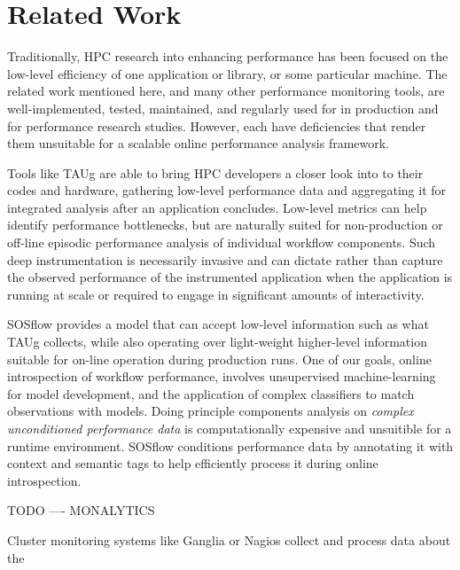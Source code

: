 
\section{Related Work}
%
Traditionally, HPC research into enhancing performance has been
focused on the low-level efficiency of one application or library, or
some particular machine.
%
The related work mentioned here, and many other performance monitoring
tools, are well-implemented, tested, maintained, and regularly used
for in production and for performance research studies.
%
However, each have deficiencies that render them unsuitable for a scalable
online performance analysis framework.
%
\par
%
Tools like TAUg \cite{huck2006taug} are able to bring HPC developers a closer look into to
their codes and hardware, gathering low-level performance data and
aggregating it for integrated analysis after an application concludes.
%
Low-level metrics can help identify performance bottlenecks, but are
naturally suited for non-production or off-line episodic performance
analysis of individual workflow components.
%
Such deep instrumentation is necessarily invasive and can dictate
rather than capture the observed performance of the instrumented
application when the application is running at scale or required to
engage in significant amounts of interactivity.
%
\par
%
SOSflow provides a model that can accept low-level information such as
what TAUg collects, while also operating over light-weight higher-level
information suitable for on-line operation during production runs.
%
One of our goals, online introspection of workflow performance,
involves unsupervised machine-learning for model development, and the
application of complex classifiers to match observations with models.
%
Doing principle components analysis on \textit{complex unconditioned
  performance data} is computationally expensive and unsuitible for a
runtime environment.
%
SOSflow conditions performance data by annotating it with context and
semantic tags to help efficiently process it during online
introspection.
%
\par
%
TODO ---- MONALYTICS
%
\par
%
Cluster monitoring systems like Ganglia \cite{massie2004ganglia} or
Nagios \cite{katsaros2011building} collect and process data about the
